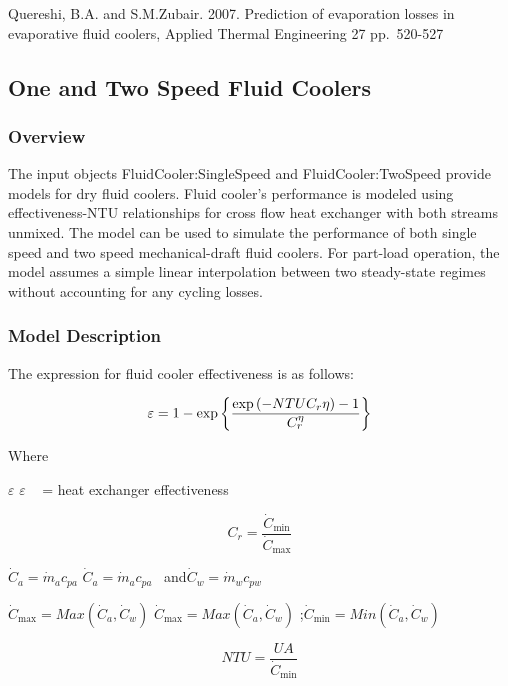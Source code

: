 Quereshi, B.A. and S.M.Zubair. 2007. Prediction of evaporation losses in evaporative fluid coolers, Applied Thermal Engineering 27 pp.~520-527

\subsection{One and Two Speed Fluid Coolers}\label{one-and-two-speed-fluid-coolers}

\subsubsection{Overview}\label{overview-2-005}

The input objects FluidCooler:SingleSpeed and FluidCooler:TwoSpeed provide models for dry fluid coolers. Fluid cooler's performance is modeled using effectiveness-NTU relationships for cross flow heat exchanger with both streams unmixed. The model can be used to simulate the performance of both single speed and two speed mechanical-draft fluid coolers. For part-load operation, the model assumes a simple linear interpolation between two steady-state regimes without accounting for any cycling losses.

\subsubsection{Model Description}\label{model-description-2-005}

The expression for fluid cooler effectiveness is as follows:

\begin{equation}
  \varepsilon = 1-\exp{\CB{ \frac{\exp{\PB{-NTU C_r \eta}}-1}{C_{r}^{\eta}} }}
\end{equation}

Where

\(\varepsilon\) \(\varepsilon\) \emph{~} = heat exchanger effectiveness

\begin{equation}
{C_r} = \frac{{{{\dot C}_{\min }}}}{{{{\dot C}_{\max }}}}
\end{equation}

\({\dot C_a} = {\dot m_a}{c_{pa}}\) \({\dot C_a} = {\dot m_a}{c_{pa}}\) ~and\({\dot C_w} = {\dot m_w}{c_{pw}}\)

\({\dot C_{\max }} = Max({\dot C_a},{\dot C_w})\) \({\dot C_{\max }} = Max({\dot C_a},{\dot C_w})\) ;\({\dot C_{\min }} = Min({\dot C_a},{\dot C_w})\)

\begin{equation}
NTU = \frac{{UA}}{{{{\dot C}_{\min }}}}
\end{equation}

